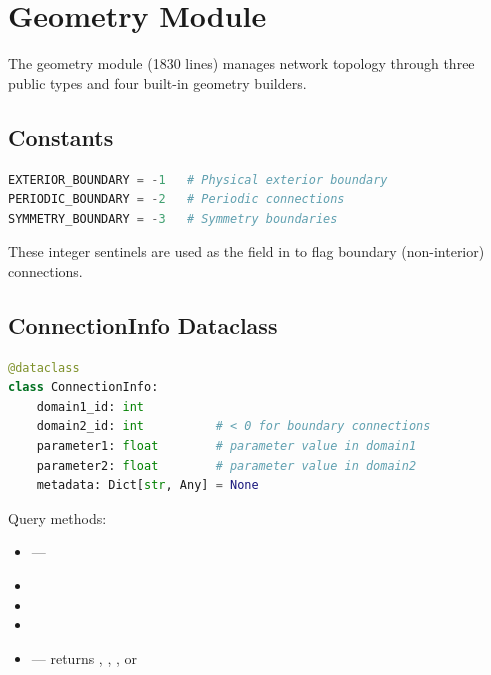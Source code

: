 \section{Geometry Module}
\label{sec:geometry}

\begin{center}
\end{center}

The geometry module (1830 lines) manages network topology through three public types and four built-in geometry builders.

\subsection{Constants}

\begin{lstlisting}[language=Python, caption={Boundary type constants}]
EXTERIOR_BOUNDARY = -1   # Physical exterior boundary
PERIODIC_BOUNDARY = -2   # Periodic connections
SYMMETRY_BOUNDARY = -3   # Symmetry boundaries
\end{lstlisting}

These integer sentinels are used as the  field in  to flag boundary (non-interior) connections.

\subsection{ConnectionInfo Dataclass}

\begin{structurebox}
\begin{lstlisting}[language=Python]
@dataclass
class ConnectionInfo:
    domain1_id: int
    domain2_id: int          # < 0 for boundary connections
    parameter1: float        # parameter value in domain1
    parameter2: float        # parameter value in domain2
    metadata: Dict[str, Any] = None
\end{lstlisting}
\end{structurebox}

\noindent Query methods:
\begin{itemize}
  \item {} --- 
  \item {}
  \item {}
  \item {}
  \item {} --- returns , , , or 
\end{itemize}

